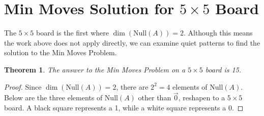 \documentclass[a4paper]{article}
\newtheorem{theorem}{Theorem}
\begin{document}
	\section{Min Moves Solution for $5 \times 5$ Board}
	The $5 \times 5$ board is the first where $\dim(\text{Null}(A)) = 2$.
	Although this means the work above does not apply directly, we can examine quiet patterns to find the solution to the Min Moves Problem.
	\begin{theorem}\label{min-moves-problem-5x5}
		The answer to the Min Moves Problem on a $5 \times 5$ board is 15.
	\end{theorem}
	\begin{proof}
		Since $\dim(\text{Null}(A)) = 2$, there are $2^2 = 4$ elements of $\text{Null}(A)$.
		Below are the three elements of $\text{Null}(A)$ other than $\vec{0}$, reshapen to a $5 \times 5$ board.
		A black square represents a 1, while a white square represents a 0.
		

\end{proof}
\end{document}
